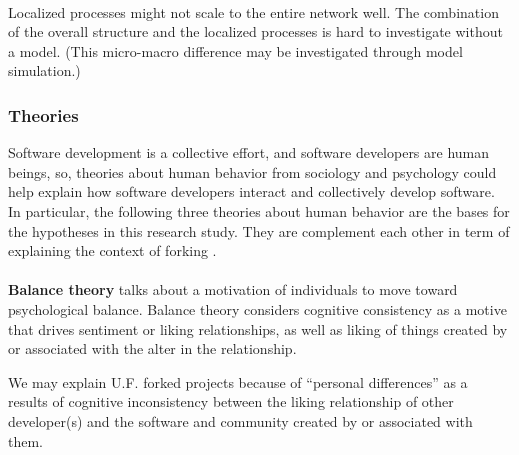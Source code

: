 \documentclass[11pt]{report}
\begin{document}
\paragraph{} Localized processes might not scale to the entire network well. The combination of the overall structure and the localized processes is hard to investigate without a model. (This micro-macro difference may be investigated through model simulation.)\cite{Robins}

\subsubsection{Theories}
Software development is a collective effort, and software developers are human beings, so, theories about human behavior from sociology and psychology could help explain how software developers interact and collectively develop software. In particular, the following three theories about human behavior are the bases for the hypotheses in this research study. They are complement each other in term of explaining the context of forking .

\paragraph{} \textbf{Balance theory} \cite{Heider} talks about a motivation of individuals to move toward psychological balance. Balance theory considers cognitive consistency as a motive that drives sentiment or liking relationships, as well as liking of things created by or associated with the alter in the relationship.

We may explain U.F. forked projects because of ``personal differences'' as a results of cognitive inconsistency between the liking relationship of other developer(s) and the software and community created by or associated with them. 
%
%
\end{document}
